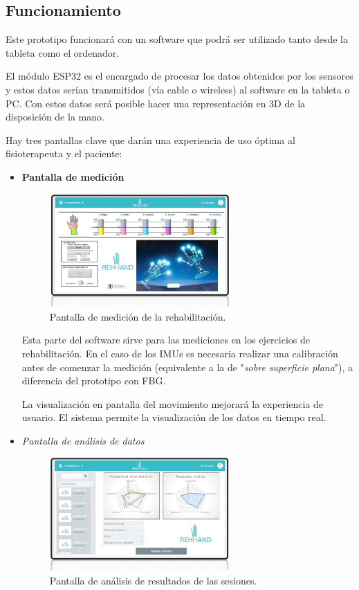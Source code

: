 \subsection{Funcionamiento}
\label{sec:funcionamiento4}

Este prototipo funcionará con un software que podrá ser utilizado tanto desde la tableta como el ordenador. 

El módulo ESP32 es el encargado de procesar los datos obtenidos por los sensores y estos datos serían transmitidos (vía cable o wireless) al software en la tableta o PC. Con estos datos será posible hacer una representación en 3D de la disposición de la mano. 

Hay tres pantallas clave que darán una experiencia de uso óptima al fisioterapeuta y el paciente:


\begin{itemize}
	\item \textbf{Pantalla de medición}
	
	\begin{figure}[H]
		\centering
		\includegraphics[width=0.65\textwidth]{./img/softwareIMU1}
		\caption{Pantalla de medición de la rehabilitación. } 
		\label{fig:softIMU1}
	\end{figure} 
	 
	 Esta parte del software sirve para las mediciones en los ejercicios de rehabilitación. En el caso de los IMUs es necesaria realizar una calibración antes de comenzar la medición (equivalente a la de "\textit{sobre superficie plana}"), a diferencia del prototipo con FBG.
	 
	 La visualización en pantalla del movimiento mejorará la experiencia de usuario. El sistema permite la visualización de los datos en tiempo real.
	
	\item \textit{Pantalla de análisis de datos}
	
	\begin{figure}[H]
		\centering
		\includegraphics[width=0.65\textwidth]{./img/softwareIMU2}
		\caption{Pantalla de análisis de resultados de las sesiones. } 
		\label{fig:softIMU2}
	\end{figure} 
	

\end{itemize}

